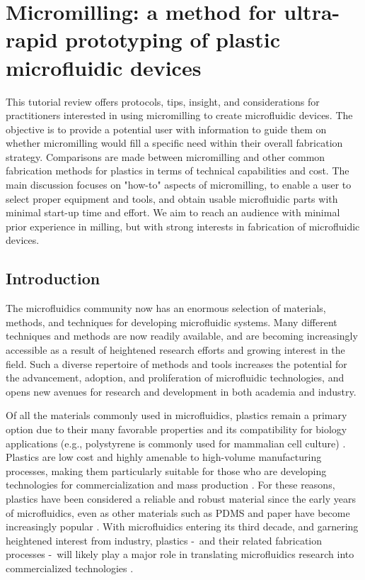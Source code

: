 \chapter{Micromilling: a method for ultra-rapid prototyping of plastic microfluidic devices}
\label{Chap:Micromilling}

This tutorial review offers protocols, tips, insight, and considerations for practitioners interested in using micromilling to create microfluidic devices. The objective is to provide a potential user with information to guide them on whether micromilling would fill a specific need within their overall fabrication strategy. Comparisons are made between micromilling and other common fabrication methods for plastics in terms of technical capabilities and cost. The main discussion focuses on "how-to" aspects of micromilling, to enable a user to select proper equipment and tools, and obtain usable microfluidic parts with minimal start-up time and effort. We aim to reach an audience with minimal prior experience in milling, but with strong interests in fabrication of microfluidic devices.

\section{Introduction}
The microfluidics community now has an enormous selection of materials, methods, and techniques for developing microfluidic systems. Many different techniques and methods are now readily available, and are becoming increasingly accessible as a result of heightened research efforts and growing interest in the field. Such a diverse repertoire of methods and tools increases the potential for the advancement, adoption, and proliferation of microfluidic technologies, and opens new avenues for research and development in both academia and industry. 

Of all the materials commonly used in microfluidics, plastics remain a primary option due to their many favorable properties and its compatibility for biology applications (e.g., polystyrene is commonly used for mammalian cell culture) \cite{Young2011}. Plastics are low cost and highly amenable to high-volume manufacturing processes, making them particularly suitable for those who are developing technologies for commercialization and mass production \cite{Mukhopadhyay2007}. For these reasons, plastics have been considered a reliable and robust material since the early years of microfluidics, even as other materials such as PDMS and paper have become increasingly popular \cite{Becker2000a, Berthier2012}. With microfluidics entering its third decade, and garnering heightened interest from industry, plastics -\, and their related fabrication processes \hyphen\, will likely play a major role in translating microfluidics research into commercialized technologies \cite{Sackmann2014}.

